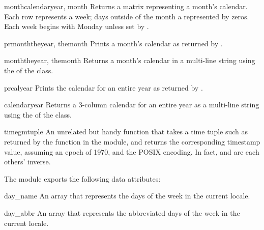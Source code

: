 \begin{funcdesc}{monthcalendar}{year, month}
Returns a matrix representing a month's calendar.  Each row represents
a week; days outside of the month a represented by zeros.
Each week begins with Monday unless set by .
\end{funcdesc}

\begin{funcdesc}{prmonth}{theyear, themonth}
Prints a month's calendar as returned by .
\end{funcdesc}

\begin{funcdesc}{month}{theyear, themonth}
Returns a month's calendar in a multi-line string using the
 of the  class.
\end{funcdesc}

\begin{funcdesc}{prcal}{year}
Prints the calendar for an entire year as returned by 
.
\end{funcdesc}

\begin{funcdesc}{calendar}{year}
Returns a 3-column calendar for an entire year as a multi-line string
using the  of the  class.
\end{funcdesc}

\begin{funcdesc}{timegm}{tuple}
An unrelated but handy function that takes a time tuple such as
returned by the  function in the 
module, and returns the corresponding \UNIX{} timestamp value, assuming
an epoch of 1970, and the POSIX encoding.  In fact,
 and  are each others' inverse.
\end{funcdesc}

The  module exports the following data attributes:

\begin{datadesc}{day_name}
An array that represents the days of the week in the
current locale.
\end{datadesc}

\begin{datadesc}{day_abbr}
An array that represents the abbreviated days of the week
in the current locale.
\end{datadesc}

